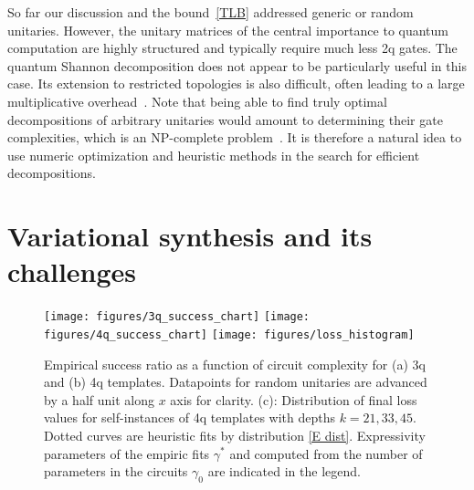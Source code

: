 \documentclass[twocolumn, amsfonts, amssymb, aps, nofootinbib]{revtex4-2}
\begin{document}
So far our discussion and the bound~\eqref{TLB} addressed generic or random unitaries. However, the unitary matrices of the central importance to quantum computation are highly structured and typically require much less 2q gates. The quantum Shannon decomposition does not appear to be particularly useful in this case. Its extension to restricted topologies is also difficult, often leading to a large multiplicative overhead~\cite{Shende2006}. Note that being able to find truly optimal decompositions of arbitrary unitaries would amount to determining their gate complexities, which is an NP-complete problem~\cite{Botea2018}. It is therefore a natural idea to use numeric optimization and heuristic methods in the search for efficient decompositions.

\section{Variational synthesis and its challenges \label{sec local minimums}}

\begin{figure*}
	\raisebox{2em}{(a)\,\,}\texttt{[image: figures/3q\_success\_chart]}
	\raisebox{2em}{\,\,(b)\,\,}\texttt{[image: figures/4q\_success\_chart]}
	\raisebox{2em}{(c)\,\,}\texttt{[image: figures/loss\_histogram]}
	\caption{Empirical success ratio as a function of circuit complexity for (a) 3q and (b) 4q templates. Datapoints for random unitaries are advanced by a half unit along $x$ axis for clarity. (c): Distribution of final loss values for self-instances of 4q templates with depths $k=21, 33, 45$. Dotted curves are heuristic fits by distribution \eqref{E dist}. Expressivity parameters of the empiric fits $\gamma^*$  and computed from the number of parameters in the circuits $\gamma_0$ are indicated in the legend.}
	\label{fig local minimums}
\end{figure*}
\end{document}
